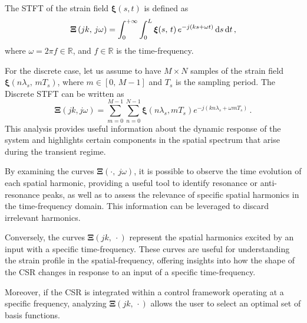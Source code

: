 The \ac{STFT} of the strain field $\bm{\xi}(s, t)$ is defined as
\begin{equation} \label{eq:space_time_ft}
    \bm{\Xi}\left(jk, \, j \omega\right) = \int_{0}^{+\infty} \int_{0}^{L} {\bm{\xi}}(s, \, t) \, e^{-j\left(k s + \omega t\right)} \, \textnormal{d} s \, \textnormal{d} t \, ,
\end{equation}
where $\omega = 2 \pi f \in \mathbb{R}$, and $f  \in \mathbb{R}$ is the time-frequency. 

For the discrete case, let us assume to have $M \times N$ samples of the strain field $\bm{\xi}(n \lambda_s, \, m T_s)$, where $m \in [0, \, M - 1]$ and $T_s$ is the sampling period. 
The Discrete \ac{STFT} can be written as
\begin{equation} \label{eq:discrete_stft}
    \bm{\Xi}\left(jk, j \omega\right) = \sum_{m = 0}^{M - 1} \sum_{n = 0}^{N - 1} \bm{\xi}\left(n \lambda_s, m T_s \right) e^{-j \left( k n \lambda_s + \omega m T_s\right)} \, .
\end{equation}
This analysis provides useful information about the dynamic response of the system and highlights certain components in the spatial spectrum that arise during the transient regime.

By examining the curves $\bm{\Xi}(\cdot, \ j \omega)$, it is possible to observe the time evolution of each spatial harmonic, providing a useful tool to identify resonance or anti-resonance peaks, as well as to assess the relevance of specific spatial harmonics in the time-frequency domain. This information can be leveraged to discard irrelevant harmonics.

Conversely, the curves $\bm{\Xi}(jk, \ \cdot)$ represent the spatial harmonics excited by an input with a specific time-frequency. These curves are useful for understanding the strain profile in the spatial-frequency, offering insights into how the shape of the \ac{CSR} changes in response to an input of a specific time-frequency.

Moreover, if the \ac{CSR} is integrated within a control framework operating at a specific frequency, analyzing $\bm{\Xi}(jk, \, \cdot)$ allows the user to select an optimal set of basis functions.

